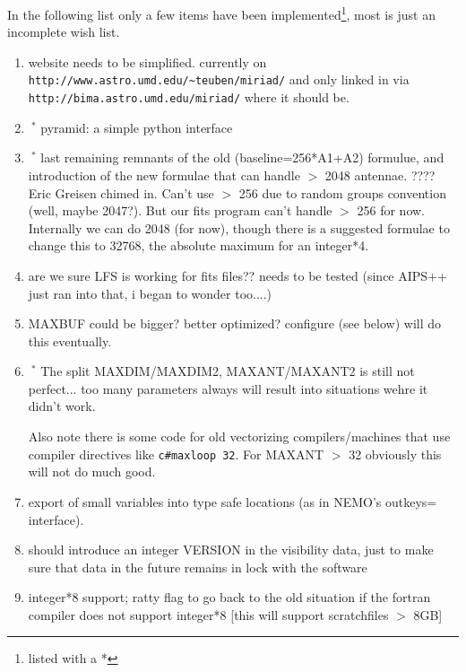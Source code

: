 In the following list only a few items have been 
implemented\footnote{listed with a *}, most is just an incomplete wish list.
\begin{enumerate}
\item
website needs to be simplified. currently on \newline
\verb+http://www.astro.umd.edu/~teuben/miriad/+
and only linked in via \newline
\verb+http://bima.astro.umd.edu/miriad/+ where it should be.

\item
$\ ^{*}$
pyramid: a simple python interface

\item
$\ ^{*}$
last remaining remnants of the old (baseline=256*A1+A2) formulue, and introduction
of the new formulae that can handle $>$ 2048 antennae. ????   Eric Greisen chimed
in. Can't use $>$ 256 due to random groups convention (well, maybe 2047?). But
our fits program can't handle $>$ 256 for now. Internally we can do 2048 (for now),
though there is a suggested formulae to change this to 32768, the absolute
maximum for an integer*4.

\item
are we sure LFS is working for fits files?? needs to be tested  (since AIPS++
just ran into that, i began to wonder too....)

\item
MAXBUF  could be bigger? better optimized? configure (see below) will do this
eventually.

\item
$\ ^{*}$
The split MAXDIM/MAXDIM2, MAXANT/MAXANT2 is still not perfect... too many parameters
always will result into situations wehre it didn't work.

Also note there is some code for old vectorizing compilers/machines that use
compiler directives like \verb+c#maxloop 32+. For MAXANT $>$ 32 obviously this
will not do much good.

\item 
export of small variables into type safe locations (as in NEMO's outkeys= interface).

\item
should introduce an integer VERSION in the visibility data, just to make sure
that data in the future remains in lock with the software

\item
integer*8 support; ratty flag to go back to the old situation if
the fortran compiler does not support integer*8
[this will support scratchfiles $>$ 8GB]


\end{enumerate}
